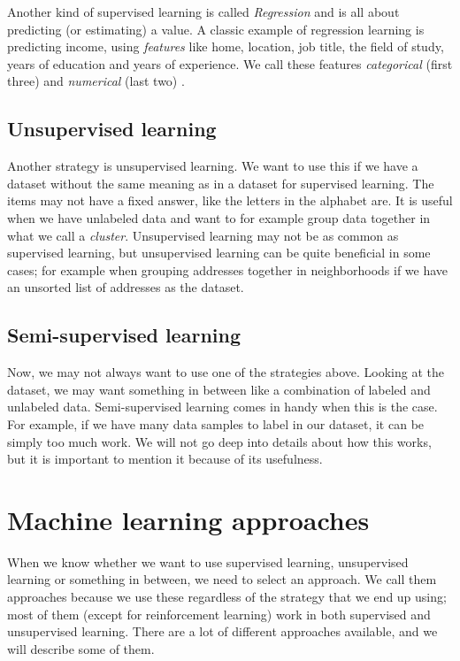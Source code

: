 Another kind of supervised learning is called \textit{Regression} and is all about predicting (or estimating) a value. A classic example of regression 
learning is predicting income, using \textit{features} like home, location, job title, the field of study,  years of education and years of experience. 
We call these features \textit{categorical} (first three) and \textit{numerical} (last two) \cite{machine_learning_for_humans_supervised_1}. 

\subsection{Unsupervised learning}
Another strategy is unsupervised learning. We want to use this if we have a dataset without the same meaning as in a dataset for supervised learning. 
The items may not have a fixed answer, like the letters in the alphabet are. It is useful when we have unlabeled data and want to for example group data 
together in what we call a \textit{cluster}. Unsupervised learning may not be as common as supervised learning, but unsupervised learning can be quite 
beneficial in some cases; for example when grouping addresses together in neighborhoods if we have an unsorted list of addresses as the dataset.

\subsection{Semi-supervised learning}
Now, we may not always want to use one of the strategies above. Looking at the dataset, we may want something in between like a combination of labeled and unlabeled data. 
Semi-supervised learning comes in handy when this is the case. For example, if we have many data samples to label in our dataset, it can be simply too much work. 
We will not go deep into details about how this works, but it is important to mention it because of its usefulness.

\section{Machine learning approaches}
When we know whether we want to use supervised learning, unsupervised learning or something in between, we need to select an approach. We call them 
approaches because we use these regardless of the strategy that we end up using; most of them (except for reinforcement learning) work in both 
supervised and unsupervised learning. There are a lot of different approaches available, and we will describe some of them.

